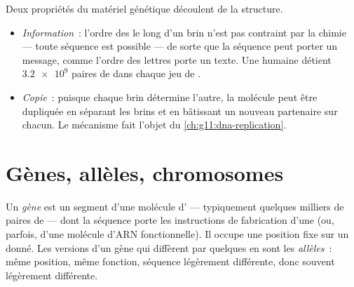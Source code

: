 \begin{proposition}\label{prop:g10:universal-dna:explains}
Deux propriétés du matériel génétique découlent de la structure.
\begin{itemize}
  \item \emph{Information}~: l'ordre des  le long d'un brin n'est
        pas contraint par la chimie --- toute séquence est possible ---
        de sorte que la séquence peut porter un message, comme l'ordre
        des lettres porte un texte. Une  humaine détient
        $\num{3.2e9}$ paires de  dans chaque jeu de .
  \item \emph{Copie}~: puisque chaque brin détermine l'autre, la
        molécule peut être dupliquée en séparant les brins et en
        bâtissant un nouveau partenaire sur chacun. Le mécanisme fait
        l'objet du \cref{ch:g11:dna-replication}.
\end{itemize}
\end{proposition}
\admitted

\section{Gènes, allèles, chromosomes}

\begin{definition}\label{def:g10:universal-dna:gene}
Un \emph{gène} est un segment d'une molécule d' ---
typiquement quelques milliers de paires de  --- dont la séquence
porte les instructions de fabrication d'une  (ou, parfois,
d'une molécule d'ARN fonctionnelle). Il occupe une position fixe sur un
 donné. Les versions d'un gène qui diffèrent par quelques
 en sont les \emph{allèles}~: même position, même
fonction, séquence légèrement différente, donc souvent 
légèrement différente.
\end{definition}


